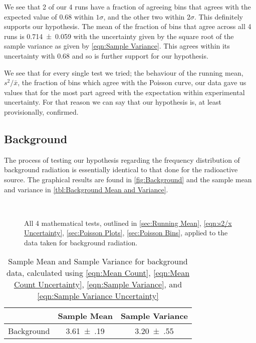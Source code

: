\documentclass[12pt]{article}
\numberwithin{equation}{section}
\numberwithin{figure}{section}
\numberwithin{table}{section}
\begin{document}
\par We see that 2 of our 4 runs have a fraction of agreeing bins that agrees with the expected value of 0.68 within $1\sigma$, and the other two within $2\sigma$. This definitely supports our hypothesis. The mean of the fraction of bins that agree across all 4 runs is \num{0.714\pm0.059} with the uncertainty given by the square root of the sample variance as given by \autoref{eqn:Sample Variance}. This agrees within its uncertainty with 0.68 and so is further support for our hypothesis. 
\par We see that for every single test we tried; the behaviour of the running mean, $s^2/\bar{x}$, the fraction of bins which agree with the Poisson curve, our data gave us values that for the most part agreed with the expectation within experimental uncertainty. For that reason we can say that our hypothesis is, at least provisionally, confirmed. 

\subsection{Background}\label{sec:background}
The process of testing our hypothesis regarding the frequency distribution of background radiation is essentially identical to that done for the radioactive source. The graphical results are found in \autoref{fig:Background} and the sample mean and variance in \autoref{tbl:Background Mean and Variance}.

\begin{figure}[H]%
    \centering
    \,
    \,
    \,
    \caption{All 4 mathematical tests, outlined in \autoref{sec:Running Mean}, \autoref{eqn:s2/x Uncertainty}, \autoref{sec:Poisson Plots}, \autoref{sec:Poisson Bins}, applied to the data taken for background radiation.}
    \label{fig:Background}
\end{figure}

\begin{table}[h]
    \centering
    \begin{tabular}{|c|c|c|}
        \hline
         & Sample Mean & Sample Variance \\\hline
        Background & \num{3.61(19)} & \num{3.20(55)}\\\hline
    \end{tabular}
    \caption{Sample Mean and Sample Variance for background data, calculated using \autoref{eqn:Mean Count}, \autoref{eqn:Mean Count Uncertainty}, \autoref{eqn:Sample Variance}, and \autoref{eqn:Sample Variance Uncertainty}}
    \label{tbl:Background Mean and Variance}
\end{table}
\end{document}
